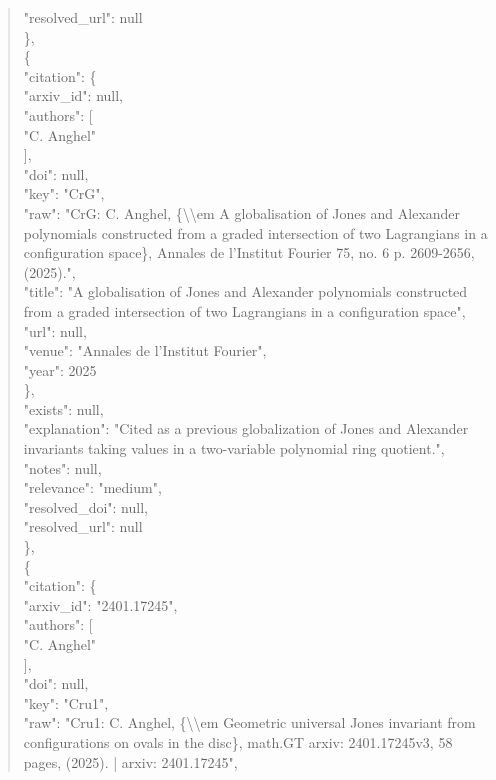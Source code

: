 \documentclass[11pt]{article}
\begin{document}
\begin{quote}
      "resolved\_url": null\\
    \},\\
    \{\\
      "citation": \{\\
        "arxiv\_id": null,\\
        "authors": [\\
          "C. Anghel"\\
        ],\\
        "doi": null,\\
        "key": "CrG",\\
        "raw": "CrG: C. Anghel, \{\textbackslash{}\textbackslash{}em A globalisation of Jones and Alexander polynomials constructed from a graded intersection of two Lagrangians in a configuration space\}, Annales de l’Institut Fourier 75, no. 6 p. 2609-2656, (2025).",\\
        "title": "A globalisation of Jones and Alexander polynomials constructed from a graded intersection of two Lagrangians in a configuration space",\\
        "url": null,\\
        "venue": "Annales de l’Institut Fourier",\\
        "year": 2025\\
      \},\\
      "exists": null,\\
      "explanation": "Cited as a previous globalization of Jones and Alexander invariants taking values in a two-variable polynomial ring quotient.",\\
      "notes": null,\\
      "relevance": "medium",\\
      "resolved\_doi": null,\\
      "resolved\_url": null\\
    \},\\
    \{\\
      "citation": \{\\
        "arxiv\_id": "2401.17245",\\
        "authors": [\\
          "C. Anghel"\\
        ],\\
        "doi": null,\\
        "key": "Cru1",\\
        "raw": "Cru1: C. Anghel, \{\textbackslash{}\textbackslash{}em Geometric universal Jones invariant from configurations on ovals in the disc\}, math.GT arxiv: 2401.17245v3, 58 pages, (2025). | arxiv: 2401.17245",\\

\end{quote}
\end{document}
